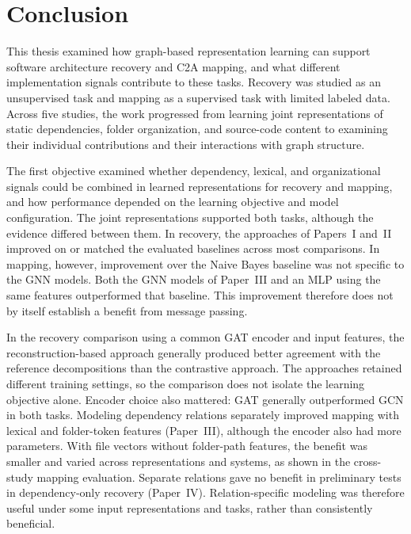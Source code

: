 \section{Conclusion \label{sec:conclusion}}

This thesis examined how graph-based representation learning can support software architecture recovery and C2A mapping, and what different implementation signals contribute to these tasks. Recovery was studied as an unsupervised task and mapping as a supervised task with limited labeled data. Across five studies, the work progressed from learning joint representations of static dependencies, folder organization, and source-code content to examining their individual contributions and their interactions with graph structure.

The first objective examined whether dependency, lexical, and organizational signals could be combined in learned representations for recovery and mapping, and how performance depended on the learning objective and model configuration. The joint representations supported both tasks, although the evidence differed between them. In recovery, the approaches of Papers~I and~II improved on or matched the evaluated baselines across most comparisons. In mapping, however, improvement over the Naive Bayes baseline was not specific to the GNN models. Both the GNN models of Paper~III and an MLP using the same features outperformed that baseline. This improvement therefore does not by itself establish a benefit from message passing.

In the recovery comparison using a common GAT encoder and input features, the reconstruction-based approach generally produced better agreement with the reference decompositions than the contrastive approach. The approaches retained different training settings, so the comparison does not isolate the learning objective alone. Encoder choice also mattered: GAT generally outperformed GCN in both tasks. Modeling dependency relations separately improved mapping with lexical and folder-token features (Paper~III), although the encoder also had more parameters. With file vectors without folder-path features, the benefit was smaller and varied across representations and systems, as shown in the cross-study mapping evaluation. Separate relations gave no benefit in preliminary tests in dependency-only recovery (Paper~IV). Relation-specific modeling was therefore useful under some input representations and tasks, rather than consistently beneficial.

